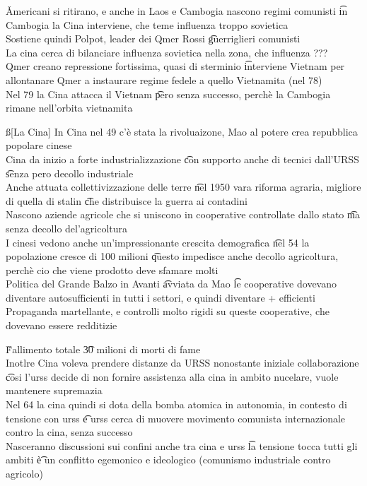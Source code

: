 \documentclass[12pt]{article}
\begin{document}
\v

Americani si ritirano, e anche in Laos e Cambogia nascono regimi comunisti \t in Cambogia la Cina interviene, che teme influenza troppo sovietica \\
Sostiene quindi Polpot, leader dei Qmer Rossi \t guerriglieri comunisti \\
La cina cerca di bilanciare influenza sovietica nella zona, che influenza ??? \\
Qmer creano repressione fortissima, quasi di sterminio \t interviene Vietnam per allontanare Qmer a instaurare regime fedele a quello Vietnamita (nel 78) \\
Nel 79 la Cina attacca il Vietnam \t pero senza successo, perchè la Cambogia rimane nell'orbita vietnamita

\ss[La Cina]
In Cina nel 49 c'è stata la rivoluaizone, Mao al potere crea repubblica popolare cinese \\
Cina da inizio a forte industrializzazione \t con supporto anche di tecnici dall'URSS \t senza pero decollo industriale \\
Anche attuata collettivizzazione delle terre \t nel 1950 vara riforma agraria, migliore di quella di stalin \t che distribuisce la guerra ai contadini \\
Nascono aziende agricole che si uniscono in cooperative controllate dallo stato \t ma senza decollo del'agricoltura \\
I cinesi vedono anche un'impressionante crescita demografica \t nel 54 la popolazione cresce di 100 milioni \t questo impedisce anche decollo agricoltura, perchè cio che viene prodotto deve sfamare molti \\
Politica del Grande Balzo in Avanti \t avviata da Mao \t le cooperative dovevano diventare autosufficienti in tutti i settori, e quindi diventare + efficienti \\
Propaganda martellante, e controlli molto rigidi su queste cooperative, che dovevano essere redditizie

\v

Fallimento totale \t 30 milioni di morti di fame \\
Inotlre Cina voleva prendere distanze da URSS nonostante iniziale collaborazione \t cosi l'urss decide di non fornire assistenza alla cina in ambito nucelare, vuole mantenere supremazia \\
Nel 64 la cina quindi si dota della bomba atomica in autonomia, in contesto di tensione con urss \t e urss cerca di muovere movimento comunista internazionale contro la cina, senza successo \\
Nasceranno discussioni sui confini anche tra cina e urss \t la tensione tocca tutti gli ambiti \t è un conflitto egemonico e ideologico (comunismo industriale contro agricolo)
\end{document}
